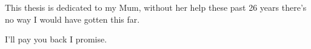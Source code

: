 
\begin{dedication} %

This thesis is dedicated to my Mum, without her help these past 26 years there's no way I would have gotten this far.

I'll pay you back I promise.

\end{dedication}


